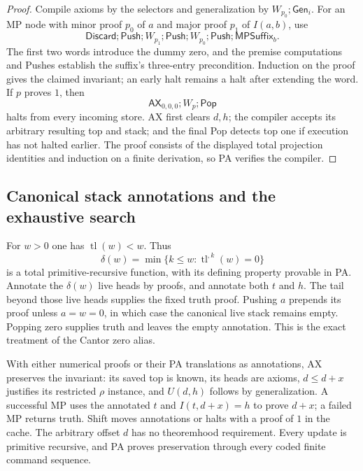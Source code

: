 \begin{proof}
Compile axioms by the selectors and generalization by
$W_{p_0};\mathsf{Gen}_i$.  For an MP node with minor proof
$p_0$ of $a$ and major proof $p_1$ of $I(a,b)$, use
\[
 \mathsf{Discard};\mathsf{Push};W_{p_1};\mathsf{Push};
 W_{p_0};\mathsf{Push};\mathsf{MPSuffix}_b.
\]
The first two words introduce the dummy zero, and the premise
computations and Pushes establish the suffix's three-entry
precondition.  Induction on the proof gives the claimed invariant;
an early halt remains a halt after extending the word.  If $p$
proves $1$, then
\[
            \mathsf{AX}_{0,0,0};W_p;\mathsf{Pop}
\]
halts from every incoming store.  AX first clears $d,h$; the
compiler accepts its arbitrary resulting top and stack; and the
final Pop detects top one if execution has not halted earlier.
The proof consists of the displayed total projection identities
and induction on a finite derivation, so PA verifies the compiler.
\end{proof}

\subsection{Canonical stack annotations and the exhaustive search}
\label{cal:scheduler}

For $w>0$ one has $\operatorname{tl}(w)<w$.  Thus
\[
 \delta(w)=\min\{k\le w:\operatorname{tl}^{,k}(w)=0\}
\]
is a total primitive-recursive function, with its defining property
provable in PA.  Annotate the $\delta(w)$ live heads by proofs, and
annotate both $t$ and $h$.  The tail beyond those live heads supplies
the fixed truth proof.  Pushing $a$ prepends its proof unless
$a=w=0$, in which case the canonical live stack remains empty.
Popping zero supplies truth and leaves the empty annotation.  This
is the exact treatment of the Cantor zero alias.

With either numerical proofs or their PA translations as annotations,
AX preserves the invariant: its saved top is known, its heads are
axioms, $d\le d+x$ justifies its restricted $\rho$ instance, and
$U(d,h)$ follows by generalization.  A successful MP uses the
annotated $t$ and $I(t,d+x)=h$ to prove $d+x$; a failed MP returns
truth.  Shift moves annotations or halts with a proof of $1$ in
the cache.  The arbitrary offset $d$ has no theoremhood requirement.
Every update is primitive recursive, and PA proves preservation
through every coded finite command sequence.


